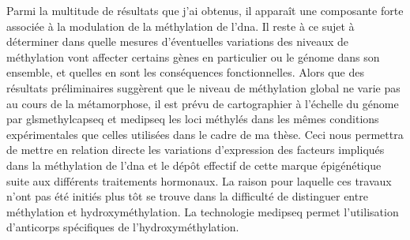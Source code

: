 \documentclass[../main.tex]{subfiles}
\begin{document}
	

	Parmi la multitude de résultats que j'ai obtenus, il apparaît une composante forte associée à la modulation de la méthylation de l'\gls{dna}.
	Il reste à ce sujet à déterminer dans quelle mesures d'éventuelles variations des niveaux de méthylation vont affecter certains gènes en particulier ou le génome dans son ensemble, et quelles en sont les conséquences fonctionnelles.
	Alors que des résultats préliminaires suggèrent que le niveau de méthylation global ne varie pas au cours de la métamorphose, il est prévu de cartographier à l'échelle du génome par gls{methylcapseq} et \gls{medipseq} les loci méthylés dans les mêmes conditions expérimentales que celles utilisées dans le cadre de ma thèse.
	Ceci nous permettra de mettre en relation directe les variations d'expression des facteurs impliqués dans la méthylation de l'\gls{dna} et le dépôt effectif de cette marque épigénétique suite aux différents traitements hormonaux.
	La raison pour laquelle ces travaux n'ont pas été initiés plus tôt se trouve dans la difficulté de distinguer entre méthylation et hydroxyméthylation.
	La technologie \gls{medipseq} permet l'utilisation d'anticorps spécifiques de l'hydroxyméthylation.
\end{document}
